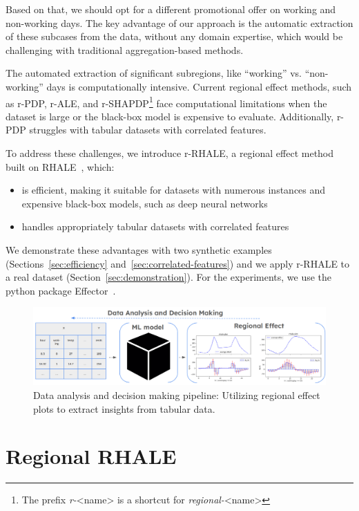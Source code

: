 \documentclass[
twocolumn,
]{ceurart}
\begin{document}
Based on that, we should opt for a different promotional offer on working and non-working days. The key advantage of our approach is the automatic extraction of these subcases from the data, without any domain expertise, which would be challenging with traditional aggregation-based methods.

The automated extraction of significant subregions, like ``working'' vs. ``non-working'' days is computationally intensive. Current regional effect methods, such as r-PDP, r-ALE, and r-SHAPDP\footnote{The prefix \textit{r-}<name> is a shortcut for \textit{regional-}<name>} face computational limitations when the dataset is large or the black-box model is expensive to evaluate. Additionally, r-PDP struggles with tabular datasets with correlated features.

To address these challenges, we introduce r-RHALE, a regional effect method built on RHALE~\cite{gkolemis2023rhale, gkolemis22a}, which:

\begin{itemize}
\item is efficient, making it suitable for datasets with numerous instances and expensive black-box models, such as deep neural networks
\item handles appropriately tabular datasets with correlated features
\end{itemize}

We demonstrate these advantages with two synthetic examples (Sections~\ref{sec:efficiency} and~\ref{sec:correlated-features}) and we apply r-RHALE to a real dataset (Section~\ref{sec:demonstration}). For the experiments, we use the python package Effector~\cite{gkolemis2024effector}.

\begin{figure}[t]
    \centering
    \includegraphics[width=\textwidth]{figures/concept_image.png}
    \caption{Data analysis and decision making pipeline: Utilizing regional effect plots to extract insights from tabular data.}
    \label{fig:concept_figure}
\end{figure}

\section{Regional RHALE}
\end{document}
